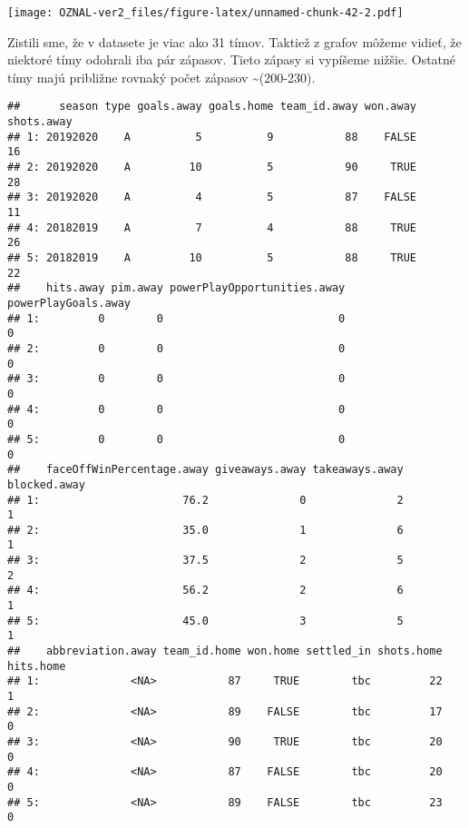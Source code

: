 \documentclass[
]{article}
\newenvironment{Shaded}{\begin{snugshade}}{\end{snugshade}}
\newcommand{\DecValTok}[1]{\textcolor[rgb]{0.00,0.00,0.81}{#1}}
\newcommand{\NormalTok}[1]{#1}
\newcommand{\SpecialCharTok}[1]{\textcolor[rgb]{0.00,0.00,0.00}{#1}}
\begin{document}
\texttt{[image: OZNAL-ver2\_files/figure-latex/unnamed-chunk-42-2.pdf]}

Zistili sme, že v datasete je viac ako 31 tímov. Taktiež z grafov môžeme
vidieť, že niektoré tímy odohrali iba pár zápasov. Tieto zápasy si
vypíšeme nižšie. Ostatné tímy majú približne rovnaký počet zápasov
\textasciitilde(200-230).

\begin{Shaded}
\end{Shaded}

\begin{verbatim}
##      season type goals.away goals.home team_id.away won.away shots.away
## 1: 20192020    A          5          9           88    FALSE         16
## 2: 20192020    A         10          5           90     TRUE         28
## 3: 20192020    A          4          5           87    FALSE         11
## 4: 20182019    A          7          4           88     TRUE         26
## 5: 20182019    A         10          5           88     TRUE         22
##    hits.away pim.away powerPlayOpportunities.away powerPlayGoals.away
## 1:         0        0                           0                   0
## 2:         0        0                           0                   0
## 3:         0        0                           0                   0
## 4:         0        0                           0                   0
## 5:         0        0                           0                   0
##    faceOffWinPercentage.away giveaways.away takeaways.away blocked.away
## 1:                      76.2              0              2            1
## 2:                      35.0              1              6            1
## 3:                      37.5              2              5            2
## 4:                      56.2              2              6            1
## 5:                      45.0              3              5            1
##    abbreviation.away team_id.home won.home settled_in shots.home hits.home
## 1:              <NA>           87     TRUE        tbc         22         1
## 2:              <NA>           89    FALSE        tbc         17         0
## 3:              <NA>           90     TRUE        tbc         20         0
## 4:              <NA>           87    FALSE        tbc         20         0
## 5:              <NA>           89    FALSE        tbc         23         0

\end{verbatim}
\end{document}
